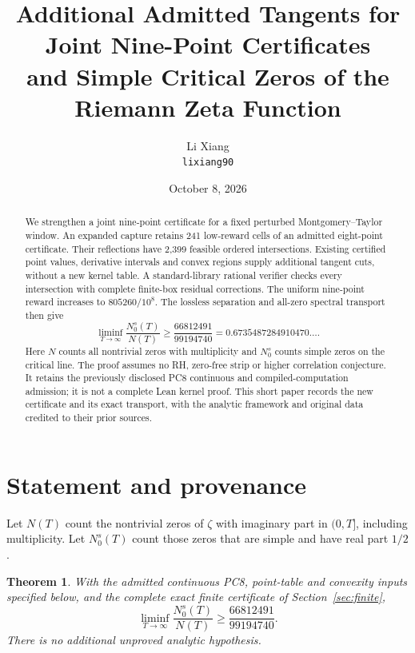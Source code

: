 \documentclass[11pt,a4paper]{article}
\title{Additional Admitted Tangents for Joint Nine-Point Certificates\\
and Simple Critical Zeros of the Riemann Zeta Function}
\author{Li Xiang\\\small \texttt{lixiang90}}
\date{October 8, 2026}
\newtheorem{theorem}{Theorem}[section]
\begin{document}
\maketitle
\begin{abstract}
We strengthen a joint nine-point certificate for a fixed perturbed
Montgomery--Taylor window. An expanded capture retains 241 low-reward
cells of an admitted eight-point certificate. Their reflections have
2,399 feasible ordered intersections. Existing certified point values,
derivative intervals and convex regions supply additional tangent cuts,
without a new kernel table. A standard-library rational verifier checks
every intersection with complete finite-box residual corrections.
The uniform nine-point reward increases to $805260/10^8$. The lossless
separation and all-zero spectral transport then give
\[
 \liminf_{T\to\infty}\frac{N_0^s(T)}{N(T)}
 \ge\frac{66812491}{99194740}=0.6735487284910470\ldots.
\]
Here $N$ counts all nontrivial zeros with multiplicity and $N_0^s$
counts simple zeros on the critical line. The proof assumes no RH,
zero-free strip or higher correlation conjecture. It retains the
previously disclosed PC8 continuous and compiled-computation admission;
it is not a complete Lean kernel proof. This short paper records the
new certificate and its exact transport, with the analytic framework
and original data credited to their prior sources.
\end{abstract}

\section{Statement and provenance}

Let $N(T)$ count the nontrivial zeros of $\zeta$ with imaginary part in
$(0,T]$, including multiplicity. Let $N_0^s(T)$ count those zeros that
are simple and have real part $1/2$.

\begin{theorem}\label{thm:main}
With the admitted continuous PC8, point-table and convexity inputs
specified below, and the complete exact finite certificate of
Section~\ref{sec:finite},
\[
 \liminf_{T\to\infty}\frac{N_0^s(T)}{N(T)}\ge\frac{66812491}{99194740}.
\]
There is no additional unproved analytic hypothesis.
\end{theorem}
\end{document}
